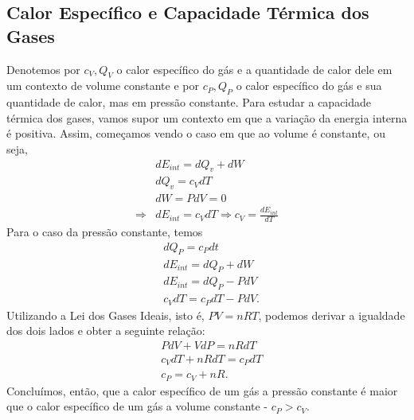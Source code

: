 \documentclass[PhysicsII/phsyicsII_notes.tex]{subfiles}
\begin{document}
\subsection{Calor Específico e Capacidade Térmica dos Gases}
Denotemos por \(c_{V}, Q_{V}\) o calor específico do gás e a quantidade de calor dele em um contexto de volume constante e por \(c_{P}, Q_{P}\) o
calor específico do gás e sua quantidade de calor, mas em pressão constante. Para estudar a capacidade térmica dos gases, vamos
supor um contexto em que a variação da energia interna é positiva. Assim, começamos vendo o caso em que ao volume é constante, ou seja,
\begin{align*}
	            & dE_{int} = dQ_{v} + dW                                     \\
	            & dQ_{v} = c_{V}dT                                           \\
	            & dW = PdV = 0                                               \\
	\Rightarrow & dE_{int} = c_{V}dT \Rightarrow c_{V} = \frac{dE_{int}}{dT}
\end{align*}
Para o caso da pressão constante, temos
\begin{align*}
	 & dQ_{P} = c_{P}dt         \\
	 & dE_{int} = dQ_{P} + dW   \\
	 & dE_{int} = dQ_{P} - PdV  \\
	 & c_{V}dT = c_{P}dT - PdV.
\end{align*}
Utilizando a Lei dos Gases Ideais, isto é, \(PV = nRT\), podemos derivar a igualdade dos dois lados e obter a seguinte relação:
\begin{align*}
	 & PdV + VdP = nRdT         \\
	 & c_{V}dT + nRdT = c_{P}dT \\
	 & c_{P} = c_{V} + nR.
\end{align*}
Concluímos, então, que a calor específico de um gás a pressão constante é maior que o calor específico de um gás a
volume constante - \(c_{P} > c_{V}\).
\end{document}
